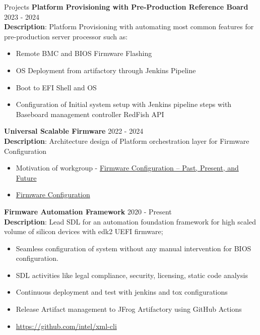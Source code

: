 \documentclass{resume} %
\begin{document}
\begin{rSection}{Projects}
\textbf{Platform Provisioning with Pre-Production Reference Board} \hfill {2023 - 2024}\\
\textbf{Description}: Platform Provisioning with automating most common features for pre-production server processor such as:

\begin{itemize}
    \item Remote BMC and BIOS Firmware Flashing
    \item OS Deployment from artifactory through Jenkins Pipeline
    \item Boot to EFI Shell and OS
    \item Configuration of Initial system setup with Jenkins pipeline steps with Baseboard management controller RedFish API
\end{itemize}

\textbf{Universal Scalable Firmware} \hfill {2022 - 2024} \\
\textbf{Description}: Architecture design of Platform orchestration layer for Firmware Configuration

\begin{itemize}
    \item Motivation of workgroup - \href{https://uefi.org/sites/default/files/resources/Firmware%20Configuration%20%E2%80%93%20Past%2C%20Present%2C%20and%20Future_Zimmer.pdf}{Firmware Configuration – Past, Present, and Future}
    \item \href{https://universalscalablefirmware.github.io/documentation/7_yaml_boot_configuration.html}{Firmware Configuration}
\end{itemize}

\textbf{Firmware Automation Framework}  \hfill {2020 - Present} \\
\textbf{Description}: Lead SDL for an automation foundation framework for high scaled volume of silicon devices with edk2 UEFI firmware;

\begin{itemize}
    \item Seamless configuration of system without any manual intervention for BIOS configuration.
    \item SDL activities like legal compliance, security, licensing, static code analysis
    \item Continuous deployment and test with jenkins and tox configurations
    \item Release Artifact management to JFrog Artifactory using GitHub Actions
    \item \href{https://github.com/intel/xml-cli}{https://github.com/intel/xml-cli}
\end{itemize}


\end{rSection}
\end{document}
